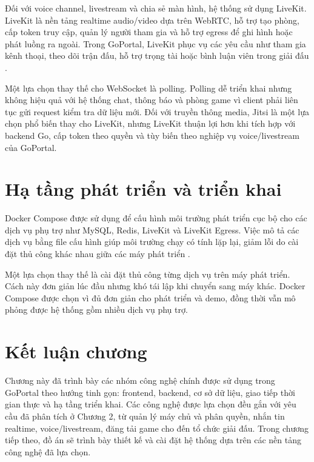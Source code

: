 Đối với voice channel, livestream và chia sẻ màn hình, hệ thống sử dụng LiveKit. LiveKit là nền tảng realtime audio/video dựa trên WebRTC, hỗ trợ tạo phòng, cấp token truy cập, quản lý người tham gia và hỗ trợ egress để ghi hình hoặc phát luồng ra ngoài. Trong GoPortal, LiveKit phục vụ các yêu cầu như tham gia kênh thoại, theo dõi trận đấu, hỗ trợ trọng tài hoặc bình luận viên trong giải đấu \cite{livekit-docs}.

Một lựa chọn thay thế cho WebSocket là polling. Polling dễ triển khai nhưng không hiệu quả với hệ thống chat, thông báo và phòng game vì client phải liên tục gửi request kiểm tra dữ liệu mới. Đối với truyền thông media, Jitsi là một lựa chọn phổ biến thay cho LiveKit, nhưng LiveKit thuận lợi hơn khi tích hợp với backend Go, cấp token theo quyền và tùy biến theo nghiệp vụ voice/livestream của GoPortal.

\section{Hạ tầng phát triển và triển khai}
\label{section:3.6}

Docker Compose được sử dụng để cấu hình môi trường phát triển cục bộ cho các dịch vụ phụ trợ như MySQL, Redis, LiveKit và LiveKit Egress. Việc mô tả các dịch vụ bằng file cấu hình giúp môi trường chạy có tính lặp lại, giảm lỗi do cài đặt thủ công khác nhau giữa các máy phát triển \cite{docker-compose-docs}.

Một lựa chọn thay thế là cài đặt thủ công từng dịch vụ trên máy phát triển. Cách này đơn giản lúc đầu nhưng khó tái lập khi chuyển sang máy khác. Docker Compose được chọn vì đủ đơn giản cho phát triển và demo, đồng thời vẫn mô phỏng được hệ thống gồm nhiều dịch vụ phụ trợ.

\section{Kết luận chương}
\label{section:3.7}

Chương này đã trình bày các nhóm công nghệ chính được sử dụng trong GoPortal theo hướng tinh gọn: frontend, backend, cơ sở dữ liệu, giao tiếp thời gian thực và hạ tầng triển khai. Các công nghệ được lựa chọn đều gắn với yêu cầu đã phân tích ở Chương 2, từ quản lý máy chủ và phân quyền, nhắn tin realtime, voice/livestream, đăng tải game cho đến tổ chức giải đấu. Trong chương tiếp theo, đồ án sẽ trình bày thiết kế và cài đặt hệ thống dựa trên các nền tảng công nghệ đã lựa chọn.
